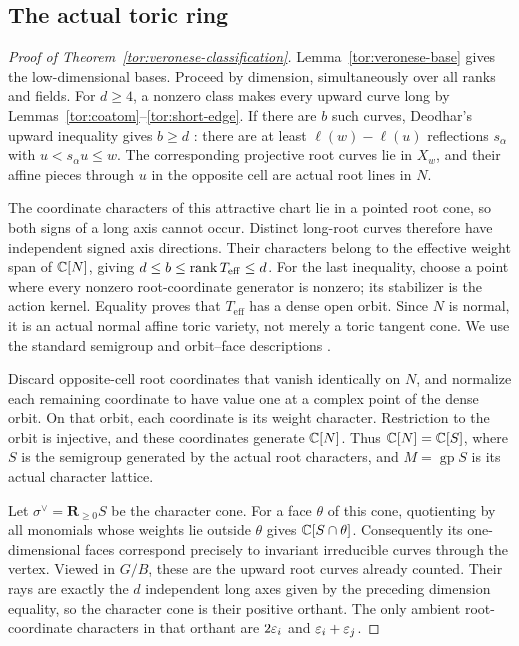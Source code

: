 \subsection{The actual toric ring}
\begin{proof}[Proof of Theorem~\ref{tor:veronese-classification}]
Lemma~\ref{tor:veronese-base} gives the low-dimensional bases. Proceed by dimension, simultaneously over all ranks and fields. For $d\ge4$, a nonzero class makes every upward curve long by Lemmas~\ref{tor:coatom}--\ref{tor:short-edge}. If there are $b$ such curves, Deodhar's upward inequality gives $b\ge d$ \cite[Proposition~2.3]{CK03}: there are at least $\ell(w)-\ell(u)$ reflections $s_\alpha$ with $u<s_\alpha u\le w$. The corresponding projective root curves lie in $X_w$, and their affine pieces through $u$ in the opposite cell are actual root lines in $N$.

The coordinate characters of this attractive chart lie in a pointed root cone, so both signs of a long axis cannot occur. Distinct long-root curves therefore have independent signed axis directions. Their characters belong to the effective weight span of $\mathbb C[N]$, giving $d\le b\le\operatorname{rank} T_{\mathrm{eff}}\le d$.
For the last inequality, choose a point where every nonzero root-coordinate generator is nonzero; its stabilizer is the action kernel. Equality proves that $T_{\mathrm{eff}}$ has a dense open orbit. Since $N$ is normal, it is an actual normal affine toric variety, not merely a toric tangent cone. We use the standard semigroup and orbit--face descriptions \cite[Chapters~1 and 3]{CLS11}.

Discard opposite-cell root coordinates that vanish identically on $N$, and normalize each remaining coordinate to have value one at a complex point of the dense orbit. On that orbit, each coordinate is its weight character. Restriction to the orbit is injective, and these coordinates generate $\mathbb C[N]$. Thus $\mathbb C[N]=\mathbb C[S]$, where $S$ is the semigroup generated by the actual root characters, and $M=\operatorname{gp}S$ is its actual character lattice.

Let $\sigma^\vee=\mathbf R_{\ge0}S$ be the character cone. For a face $\theta$ of this cone, quotienting by all monomials whose weights lie outside $\theta$ gives $\mathbb C[S\cap\theta]$. Consequently its one-dimensional faces correspond precisely to invariant irreducible curves through the vertex. Viewed in $G/B$, these are the upward root curves already counted. Their rays are exactly the $d$ independent long axes given by the preceding dimension equality, so the character cone is their positive orthant. The only ambient root-coordinate characters in that orthant are $2\varepsilon_i$ and $\varepsilon_i+\varepsilon_j$.


\end{proof}

